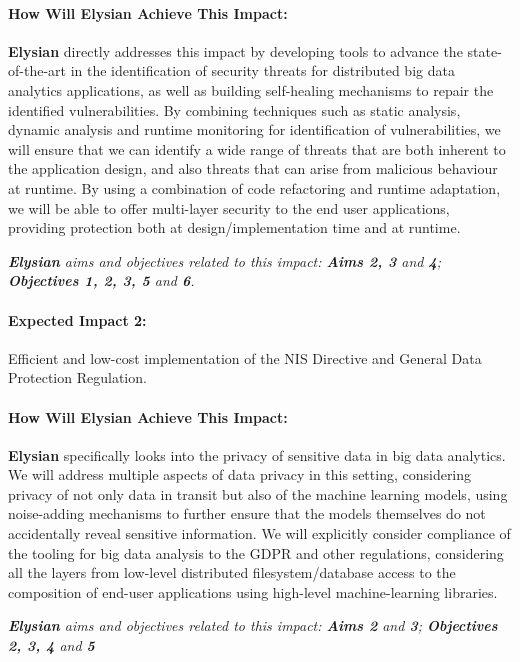 \documentclass[a4paper,11pt]{article}
\newcommand{\project}[1]{\textbf{#1}\xspace}
\newcommand{\SECURITY}{\project{Elysian}}
\newcommand{\TheProject}{\SECURITY}
\begin{document}
\begin{mdframed}[backgroundcolor=gray!10]
\paragraph{How Will \TheProject{} Achieve This Impact:}
\TheProject{} directly addresses this impact by developing tools to advance the state-of-the-art in the identification of security threats for distributed big data analytics applications, as well as building  self-healing mechanisms to repair the identified vulnerabilities. By combining techniques such as static analysis, dynamic analysis and runtime monitoring for identification of vulnerabilities, we will ensure that we can identify a wide range of threats that are both inherent to the application design, and also threats that can arise from malicious behaviour at runtime. By using a combination of code refactoring and runtime adaptation, we will be able to offer multi-layer security to the end user applications, providing protection both at design/implementation time and at runtime.

\emph{\TheProject{} aims and objectives related to this impact: \textbf{Aims 2, 3 } and \textbf{4}; \textbf{Objectives 1, 2, 3, 5} and \textbf{6}.}
\end{mdframed}

\begin{mdframed}[backgroundcolor=blue!5]
\paragraph{Expected Impact 2:}
Efficient and low-cost implementation of the NIS Directive and General Data Protection Regulation.
\end{mdframed}

\begin{mdframed}[backgroundcolor=gray!10]
\paragraph{How Will \TheProject{} Achieve This Impact:}
\TheProject{} specifically looks into the privacy of sensitive data in big data analytics. We will address multiple aspects of data privacy in this setting, considering privacy of not only data in transit but also of the machine learning models, using noise-adding mechanisms to further ensure that the models themselves do not accidentally reveal sensitive information. We will explicitly consider compliance of the tooling for big data analysis to the GDPR and other regulations, considering all the layers from low-level distributed filesystem/database access to the composition of end-user applications using high-level machine-learning libraries.

\emph{\TheProject{} aims and objectives related to this impact: \textbf{Aims 2}  and \textbf{3}; \textbf{Objectives 2, 3, 4} and \textbf{5} }
\end{mdframed}
\end{document}
